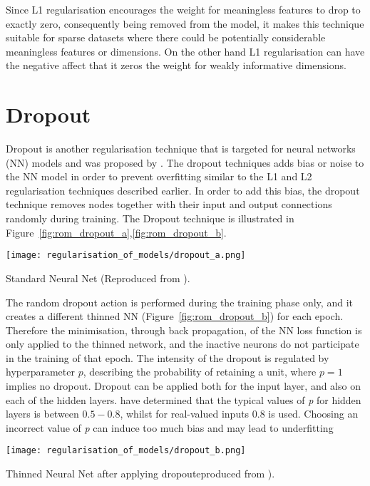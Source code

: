 Since L1 regularisation encourages the weight for meaningless features to drop to exactly zero, consequently being removed from the model, it makes this technique suitable for sparse datasets where there could be potentially considerable meaningless features or dimensions. On the other hand L1 regularisation can have the negative affect that it zeros the weight for weakly informative dimensions. 


\section{Dropout} 

Dropout is another regularisation technique that is targeted for neural networks (NN) models and was proposed by \citet{srivastava2014dropout}. The dropout techniques adds bias or noise to the NN model in order to prevent overfitting similar to the L1 and L2 regularisation techniques described earlier. In order to add this bias, the dropout technique removes nodes together with their input and output connections randomly during training. The Dropout technique is illustrated in Figure~\ref{fig:rom_dropout_a},\ref{fig:rom_dropout_b}. 

\begin{marginfigure}%
	\centering
	\texttt{[image: regularisation\_of\_models/dropout\_a.png]}
	\caption{Standard Neural Net (Reproduced from \citet{srivastava2014dropout}).}
	\label{fig:rom_dropout_a}
\end{marginfigure}


The random dropout action is performed during the training phase only, and it creates a different thinned NN (Figure~\ref{fig:rom_dropout_b})  for each epoch. Therefore the minimisation, through back propagation, of the NN loss function is only applied to the thinned network, and the inactive neurons do not participate in the training of that epoch. The intensity of the dropout is regulated by hyperparameter $p$, describing the probability of retaining a unit, where $p = 1$ implies no dropout. Dropout can be applied both for the input layer, and also on each of the hidden layers. \citet{srivastava2014dropout} have determined that the typical values of \textit{p} for hidden layers is between $0.5-0.8$, whilst for real-valued inputs $0.8$ is used. Choosing an incorrect value of \textit{p} can induce too much bias and may lead to underfitting

\begin{marginfigure}%
	\centering	
	\texttt{[image: regularisation\_of\_models/dropout\_b.png]}
	\caption{Thinned Neural Net after applying dropouteproduced from \citet{srivastava2014dropout}).}
	\label{fig:rom_dropout_b}
\end{marginfigure}



